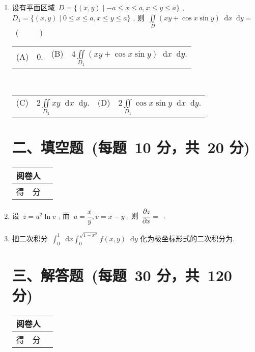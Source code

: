 \documentclass[space]{ctexart}
\makeatletter
\def\dif{\mathop{}\!\mathrm{d}}
\newcommand{\twoch}[4]{\\\begin{tabular}{*{2}{@{}p{7cm}}}(A)~#1 & (B)~#2\end{tabular}\\\begin{tabular}{*{2}{@{}p{7cm}}}(C)~#3 &
		(D)~#4\end{tabular}}  %
\def\tiankongdaan#1{\makebox[3em][c]{#1}}
\newcommand{\blank}[1]{\underline{\tiankongdaan{\hspace{4cm}}}}
\makeatother
\begin{document}
\setcounter{enumii}{0}
\begin{enumerate}[itemsep=1.2em,topsep=0pt,left=2em] %
\item 设有平面区域~$D=\{(x,y)\mid -a\leqslant x\leqslant a, x\leqslant y\leqslant a\}$ , ~$D_1=\{(x,y)\mid 0\leqslant x\leqslant a, x\leqslant y\leqslant a\}$ , 则~$\displaystyle{\iint\limits_{D}(xy+\cos x\sin y)\dif x\dif y}=$ ~(~~~~~~)
 \twoch{~$0$.}{~$4\displaystyle{\iint\limits_{D_1}(xy+\cos x\sin y)\dif x\dif y}$.}{~$2\displaystyle{\iint\limits_{D_1}xy\dif x\dif y}$.}{~$2\displaystyle{\iint\limits_{D_1}\cos x\sin y\dif x\dif y}$.}



\section*{\hspace{4cm} 二、填空题~(每题~10 分，共~20 分)}
\vspace{-1.3cm} \hspace{-1cm} 
		\begin{tabular}{|p{}|p{}|}
			\hline
			\centering 阅卷人& \\
			\hline
			\centering 得~~分 &  \\
			\hline
		\end{tabular}



  \item 设~$z = u^2\ln v$ , 而~$u= \dfrac{x}{y}, v = x-y$ , 则~$\dfrac{\partial z}{\partial x}= $~\blank{~~$\dfrac{2x}{y^2}\ln(x-y)+\dfrac{x^2}{y^2(x-y)}$~~}.
  
  \item 把二次积分~$\displaystyle{\int_0^1 \dif x \int_0^{\sqrt{1-x^2}} f(x,y) \dif y}$ 化为极坐标形式的二次积分为\blank{~~~$\displaystyle{\int_0^{\pi/2} \dif \theta \int_0^1 f(\rho \cos\theta, \rho\sin\theta)\rho \dif \rho}$~~~~}.

\section*{\hspace{4cm} 三、解答题~(每题~30 分，共~120 分)}
\vspace{-1.3cm} \hspace{-1cm} 
		\begin{tabular}{|p{}|p{}|}
			\hline
			\centering 阅卷人& \\
			\hline
			\centering 得~~分 &  \\
			\hline
		\end{tabular}
  

\end{enumerate}
\end{document}

